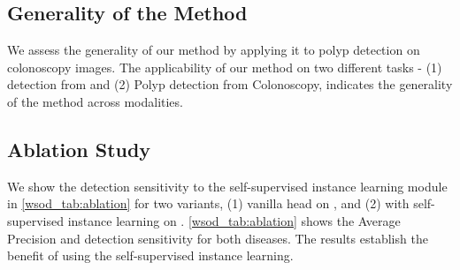 
\subsection{Generality of the Method}
%
We assess the generality of our method by applying it to polyp detection on colonoscopy images. The applicability of our method on two different tasks - (1) \gbc detection from \usg and (2) Polyp detection from Colonoscopy, indicates the generality of the method across modalities. 

\subsection{Ablation Study}
%
We show the detection sensitivity to the self-supervised instance learning module in \cref{wsod_tab:ablation} for two variants, (1) vanilla \mil head on \detr, and (2) \mil with self-supervised instance learning on \detr. \cref{wsod_tab:ablation} shows the Average Precision and detection sensitivity for both diseases. The results establish the benefit of using the self-supervised instance learning. %

